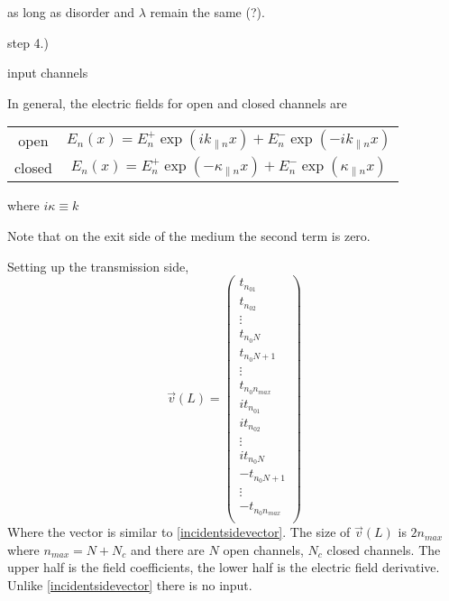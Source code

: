 as long as disorder and $\lambda$ remain the same (?).

step 4.)

input channels

In general, the electric fields for open and closed channels are
\begin{center}
\begin{tabular}{cc}
open \quad \quad \quad & $ E_n(x) = E_n^+ \exp(i k_{\parallel n} x) + E_n^- \exp(-i k_{\parallel n} x) $ \\
closed  \quad \quad \quad & $ E_n(x) = E_n^+ \exp(-\kappa_{\parallel n} x) + E_n^- \exp(\kappa_{\parallel n} x) $ \\
\end{tabular}
\end{center}
where $i \kappa \equiv k$

Note that on the exit side of the medium the second term is zero.

Setting up the transmission side,
\begin{equation}
\vec{v}(L) = 
\left( \begin{array}{c}
t_{n_01} \\      %
t_{n_02} \\      %
\vdots \\        %
t_{n_0N} \\	 %
t_{n_0N+1} \\    %
\vdots \\        %
t_{n_0n_{max}} \\ %
i t_{n_01} \\    %
i t_{n_02} \\    %
\vdots \\        %
i t_{n_0N} \\	 %
-t_{n_0N+1} \\   %
\vdots \\        %
-t_{n_0n_{max}} \\ %
\end{array} \right)
\label{transmissionsidevector}
\end{equation}
Where the vector is similar to \ref{incidentsidevector}.  The size of $\vec{v}(L)$ is $2 n_{max}$ where $n_{max} = N+N_c$ and there are $N$ open channels, $N_c$ closed channels. The upper half is the field coefficients, the lower half is the electric field derivative. Unlike \ref{incidentsidevector} there is no input.

